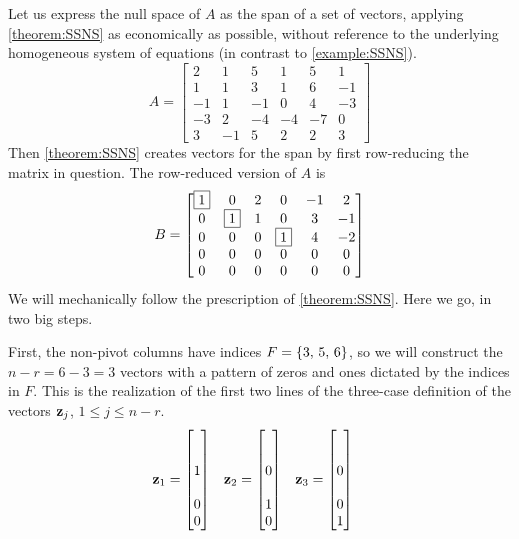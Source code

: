\documentclass{ximera}
\begin{document}
\begin{example}
  Let us express the null space of $A$ as the span of a set of
  vectors, applying \ref{theorem:SSNS} as economically as possible,
  without reference to the underlying homogeneous system of equations
  (in contrast to \ref{example:SSNS}).
  \[
    A=
    \begin{bmatrix}
      2 & 1 & 5 & 1 & 5 & 1 \\
      1 & 1 & 3 & 1 & 6 & -1 \\
      -1 & 1 & -1 & 0 & 4 & -3 \\
      -3 & 2 & -4 & -4 & -7 & 0 \\
      3 & -1 & 5 & 2 & 2 & 3
    \end{bmatrix}
  \]
  Then \ref{theorem:SSNS} creates vectors for the span by first
  row-reducing the matrix in question.  The row-reduced version of $A$
  is
  \[
    B=
    \begin{bmatrix}
      \fbox{1} & 0 & 2 & 0 & -1 & 2 \\
      0 & \fbox{1} & 1 & 0 & 3 & -1 \\
      0 & 0 & 0 & \fbox{1} & 4 & -2 \\
      0 & 0 & 0 & 0 & 0 & 0 \\
      0 & 0 & 0 & 0 & 0 & 0
    \end{bmatrix}
  \]
  We will mechanically follow the prescription of \ref{theorem:SSNS}.
  Here we go, in two big steps.

  First, the non-pivot columns have indices $F=\left\{3,\,5,\,6\right\}$, so we
  will construct the $n-r=6-3=3$ vectors with a pattern of zeros and
  ones dictated by the indices in $F$.  This is the realization of the
  first two lines of the three-case definition of the vectors
  $\mathbf{z}_j$, $1\leq j\leq n-r$.
  \begin{align*}
    \mathbf{z}_1&=\begin{bmatrix}\\ \\ 1\\ \\0 \\ 0\end{bmatrix}
              &
                \mathbf{z}_2&=\begin{bmatrix}\\ \\ 0\\ \\ 1\\ 0\end{bmatrix}
              &
                \mathbf{z}_3&=\begin{bmatrix}\\ \\ 0\\ \\ 0\\ 1\end{bmatrix}
  \end{align*}


\end{example}
\end{document}
